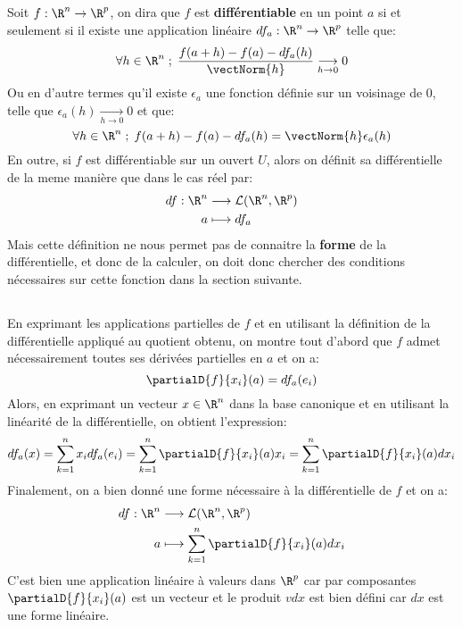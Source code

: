 \subsection*{}
Soit \(f : \R^n \rightarrow \R^p\), on dira que \(f\) est \textbf{différentiable} en un point \(a\) si et seulement si il existe une application linéaire \(df_a : \R^n \rightarrow \R^p\) telle que:
\[
   \forall h \in \R^n \; ; \; \frac{f(a + h) - f(a) - df_a(h)}{\vectNorm{h}} \underset{h \rightarrow 0}{\longrightarrow} 0
\]
Ou en d'autre termes qu'il existe \(\epsilon_a\) une fonction définie sur un voisinage de \(0\), telle que \(\epsilon_a(h) \underset{h \rightarrow 0}{\rightarrow} 0\) et que: 
\[
   \forall h \in \R^n \; ; \; f(a + h) - f(a) - df_a(h) = \vectNorm{h}\epsilon_a(h)
\]
En outre, si \(f\) est différentiable sur un ouvert \(U\), alors on définit sa différentielle de la meme manière que dans le cas réel par:
\[
   \begin{aligned}
      df : \R^n &\longrightarrow \mathcal{L}(\R^n, \R^p)\\
      a &\longmapsto df_a
   \end{aligned}  
\]
Mais cette définition ne nous permet pas de connaitre la \textbf{forme} de la différentielle, et donc de la calculer, on doit donc chercher des conditions nécessaires sur cette fonction dans la section suivante. 

\subsection*{}
En exprimant les applications partielles de \(f\) et en utilisant la définition de la différentielle appliqué au quotient obtenu, on montre tout d'abord que \(f\) admet nécessairement toutes ses dérivées partielles en \(a\) et on a:
\[
   \partialD{f}{x_i}(a) = df_a(e_i)   
\]
Alors, en exprimant un vecteur \(x \in \R^n\) dans la base canonique et en utilisant la linéarité de la différentielle, on obtient l'expression:
\[
   df_a(x) = \sum_{k=1}^{n}x_i df_a(e_i) = \sum_{k=1}^{n} \partialD{f}{x_i}(a) x_i = \sum_{k=1}^{n} \partialD{f}{x_i}(a) dx_i
\]
Finalement, on a bien donné une forme nécessaire à la différentielle de \(f\) et on a:
\[
   \begin{aligned}
      df : \R^n &\longrightarrow \mathcal{L}(\R^n, \R^p)\\
      a &\longmapsto \sum_{k=1}^{n} \partialD{f}{x_i}(a) dx_i
   \end{aligned}  
\]
C'est bien une application linéaire à valeurs dans \(\R^p\) car par composantes \(\partialD{f}{x_i}(a)\) est un vecteur et le produit \(vdx\) est bien défini car \(dx\) est une forme linéaire.\<

